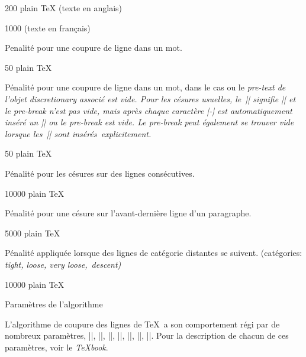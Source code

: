 \beginvalues
\item{200} plain TeX (texte en anglais)
\item{1000}  (texte en français)
\endvalues

\item\hyphenpenalty
Penalité pour une coupure de ligne dans un mot.

\beginvalues
\item{50} plain TeX
\endvalues

\item\exhyphenpenalty
Pénalité pour une coupure de ligne dans un mot, dans le cas ou le
\em{pre-text} de l'objet discretionary associé est vide. Pour les
césures usuelles, le~|\-| signifie |\discretionary{-}{}{}| et le
\em{pre-break} n'est pas vide, mais après chaque caractère |-| est
automatiquement inséré un |\discretionary{}{}{}| ou le \em{pre-break}
est vide. Le \em{pre-break} peut également se trouver vide lorsque
les~|\discretionary| sont insérés~explicitement.

\beginvalues
\item{50} plain \TeX
\endvalues

\item\doublehyphendemerits
Pénalité pour les césures sur des lignes consécutives.

\beginvalues
\item{10000} plain \TeX
\endvalues

\item\finalhyphendemerits
Pénalité pour une césure sur l'avant-dernière ligne d'un
paragraphe.

\beginvalues
\item{5000} plain \TeX
\endvalues

\item\adjdemerits
Pénalité appliquée lorsque des lignes de catégorie distantes se
suivent. (catégories: \em{tight}, \em{loose}, \em{very loose},~\em{descent}\/)

\beginvalues
\item{10000} plain \TeX
\endvalues

\endcslist


\formalpar Paramètres de l'algorithme

L'algorithme de coupure des lignes de \TeX\ a son comportement régi
par de nombreux paramètres, |\pretolerance|, |\tolerance|,
|\hyphenpenalty|, |\exyphenpenalty|, |\doublehyphendemerits|,
|\finalhyphendemerits|, |\adjdemerits|. Pour la description de chacun
de ces paramètres, voir le {\sl\TeX book}.

